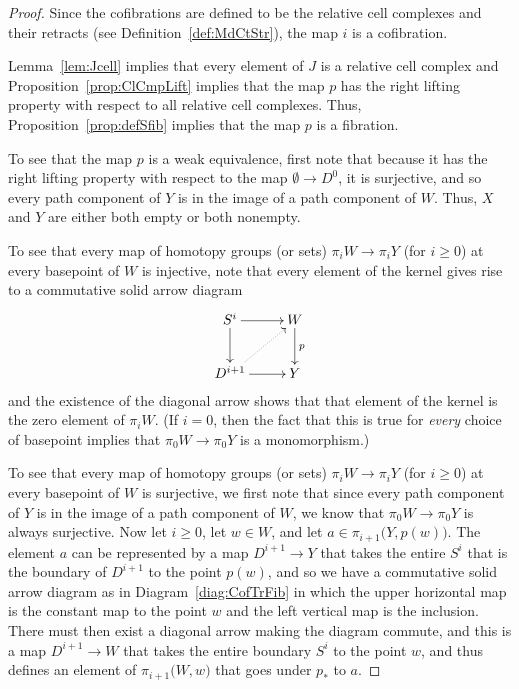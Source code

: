 \documentclass[12pt]{amsart}
\numberwithin{equation}{section}
\theoremstyle{slplain}
\theoremstyle{definition}
\theoremstyle{remark}
\newcommand{\propref}{Proposition~\ref}
\newcommand{\lemref}{Lemma~\ref}
\newcommand{\defref}{Definition~\ref}
\newcommand{\diagref}{Diagram~\ref}
\begin{document}
\begin{proof}
  Since the cofibrations are defined to be the relative cell complexes
  and their retracts (see \defref{def:MdCtStr}), the map $i$ is a
  cofibration.

  \lemref{lem:Jcell} implies that every element of $J$ is a relative
  cell complex and \propref{prop:ClCmpLift} implies that the map $p$
  has the right lifting property with respect to all relative cell
  complexes.  Thus, \propref{prop:defSfib} implies that the map $p$ is
  a fibration.

  To see that the map $p$ is a weak equivalence, first note that
  because it has the right lifting property with respect to the map
  $\emptyset \to D^{0}$, it is surjective, and so every path component
  of $Y$ is in the image of a path component of $W$.  Thus, $X$ and
  $Y$ are either both empty or both nonempty.

  To see that every map of homotopy groups (or sets) $\pi_{i}W \to
  \pi_{i}Y$ (for $i \ge 0$) at every basepoint of $W$ is injective,
  note that every element of the kernel gives rise to a commutative
  solid arrow diagram
  \begin{equation}
    \label{diag:CofTrFib}
    \vcenter{
      \xymatrix{
        {S^{i}} \ar[r] \ar[d]
        & {W} \ar[d]^{p}\\
        {D^{i+1}} \ar[r] \ar@{..>}[ur]
        & {Y}
      }%
    }%
  \end{equation}
  and the existence of the diagonal arrow shows that that element of
  the kernel is the zero element of $\pi_{i}W$.  (If $i = 0$, then the
  fact that this is true for \emph{every} choice of basepoint implies
  that $\pi_{0}W \to \pi_{0}Y$ is a monomorphism.)

  To see that every map of homotopy groups (or sets) $\pi_{i}W \to
  \pi_{i}Y$ (for $i \ge 0$) at every basepoint of $W$ is surjective,
  we first note that since every path component of $Y$ is in the image
  of a path component of $W$, we know that $\pi_{0}W \to \pi_{0}Y$ is
  always surjective.  Now let $i \ge 0$, let $w \in W$, and let $a \in
  \pi_{i+1}\bigl(Y, p(w)\bigr)$.  The element $a$ can be represented
  by a map $D^{i+1} \to Y$ that takes the entire $S^{i}$ that is the
  boundary of $D^{i+1}$ to the point $p(w)$, and so we have a
  commutative solid arrow diagram as in \diagref{diag:CofTrFib} in
  which the upper horizontal map is the constant map to the point $w$
  and the left vertical map is the inclusion.  There must then exist a
  diagonal arrow making the diagram commute, and this is a map
  $D^{i+1} \to W$ that takes the entire boundary $S^{i}$ to the point
  $w$, and thus defines an element of $\pi_{i+1}\bigl(W,w\bigr)$ that
  goes under $p_{*}$ to $a$.
\end{proof}
\end{document}
